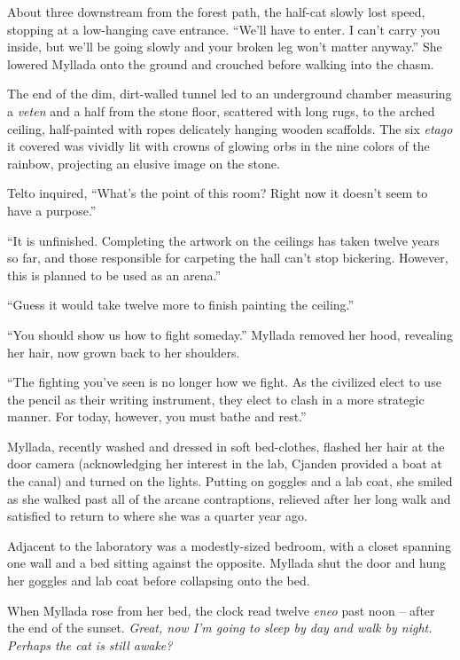 About three \eletyn{} downstream from the forest path, the half-cat slowly lost speed, stopping at a low-hanging cave entrance. ``We'll have to enter. I can't carry you inside, but we'll be going slowly and your broken leg won't matter anyway.'' She lowered Myllada onto the ground and crouched before walking into the chasm.

\centeredstars

The end of the dim, dirt-walled tunnel led to an underground chamber measuring a \emph{veten} and a half from the stone floor, scattered with long rugs, to the arched ceiling, half-painted with ropes delicately hanging wooden scaffolds. The six \emph{etago} it covered was vividly lit with crowns of glowing orbs in the nine colors of the rainbow, projecting an elusive image on the stone.

Telto inquired, ``What's the point of this room? Right now it doesn't seem to have a purpose.''

``It is unfinished. Completing the artwork on the ceilings has taken twelve years so far, and those responsible for carpeting the hall can't stop bickering. However, this is planned to be used as an arena.''

``Guess it would take twelve more to finish painting the ceiling.''

``You should show us how to fight someday.'' Myllada removed her hood, revealing her hair, now grown back to her shoulders.

``The fighting you've seen is no longer how we fight. As the civilized elect to use the pencil as their writing instrument, they elect to clash in a more strategic manner. For today, however, you must bathe and rest.''

\centeredstars

Myllada, recently washed and dressed in soft bed-clothes, flashed her hair at the door camera (acknowledging her interest in the lab, Cjanden provided a boat at the canal) and turned on the lights. Putting on goggles and a lab coat, she smiled as she walked past all of the arcane contraptions, relieved after her long walk and satisfied to return to where she was a quarter year ago.

Adjacent to the laboratory was a modestly-sized bedroom, with a closet spanning one wall and a bed sitting against the opposite. Myllada shut the door and hung her goggles and lab coat before collapsing onto the bed.

\centeredstars

When Myllada rose from her bed, the clock read twelve \emph{eneo} past noon -- after the end of the sunset. \emph{Great, now I'm going to sleep by day and walk by night. Perhaps the cat is still awake?}

